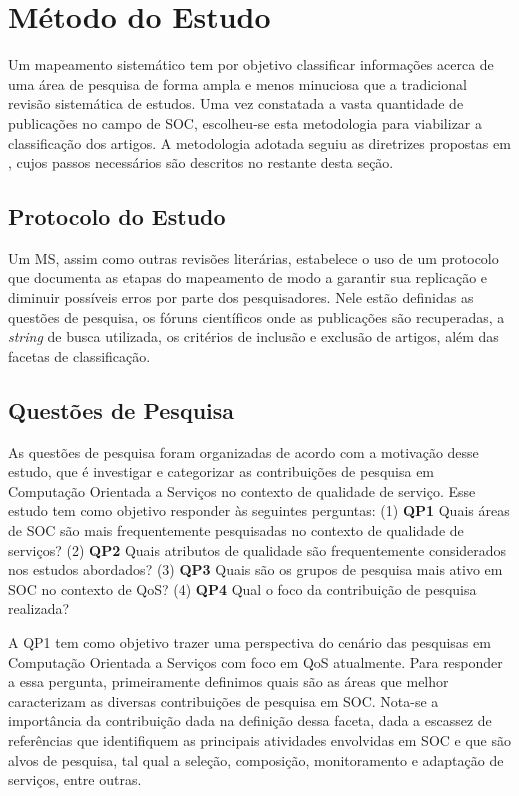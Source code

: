 
\section{Método do Estudo}\label{sec:review_method}

Um mapeamento sistemático tem por objetivo classificar informações acerca de uma área de pesquisa de forma ampla e menos minuciosa que a tradicional revisão sistemática de estudos. Uma vez constatada a vasta quantidade de publicações no campo de SOC, escolheu-se esta metodologia para viabilizar a classifica\c c\~{a}o dos artigos. A metodologia adotada seguiu as diretrizes propostas em \cite{petersen:sms2008}, cujos passos necess\'{a}rios s\~{a}o descritos no restante desta se\c c\~{a}o.

\subsection{Protocolo do Estudo}

Um MS, assim como outras revisões literárias, estabelece o uso de um protocolo que documenta as etapas do mapeamento de modo a garantir sua replicação e diminuir possíveis erros por parte dos pesquisadores. Nele estão definidas as questões de pesquisa, os fóruns científicos onde as publicações s\~{a}o recuperadas, a \textit{string} de busca utilizada, os critérios de inclusão e exclusão de artigos, além das facetas de classificação.

\subsection{Quest\~{o}es de Pesquisa}\label{sec:questoesPesquisa}

As questões de pesquisa foram organizadas de acordo com a motivação desse estudo, que é investigar e categorizar as contribuições de pesquisa em Computação Orientada a Serviços no contexto de qualidade de serviço. Esse estudo tem como objetivo responder às seguintes perguntas: (1) \textbf{QP1} Quais áreas de SOC são mais frequentemente pesquisadas no contexto de qualidade de serviços? (2) \textbf{QP2} Quais atributos de qualidade são frequentemente considerados nos estudos abordados? (3) \textbf{QP3} Quais s\~{a}o os grupos de pesquisa mais ativo em SOC no contexto de QoS? (4) \textbf{QP4} Qual o foco da contribuição de pesquisa realizada?

A QP1 tem como objetivo trazer uma perspectiva do cen\'{a}rio das pesquisas em Computa\c{c}\~{a}o Orientada a Servi\c{c}os com foco em QoS atualmente. Para responder a essa pergunta, primeiramente definimos quais s\~{a}o as \'{a}reas que melhor caracterizam as diversas contribui\c{c}\~{o}es de pesquisa em SOC. Nota-se a importância da contribuição dada na definição dessa faceta, dada a escassez de referências que identifiquem as principais atividades envolvidas em SOC e que são alvos de pesquisa, tal qual a seleção, composição, monitoramento e adaptação de serviços, entre outras.

